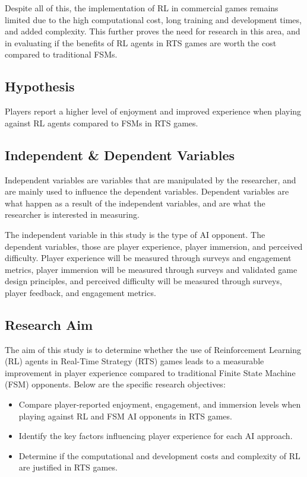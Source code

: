 \documentclass[conference]{IEEEtran}
\begin{document}
Despite all of this, the implementation of RL in commercial games remains limited due to the high computational cost, long training and development times, and added complexity.
This further proves the need for research in this area, and in evaluating if the benefits of RL agents in RTS games are worth the cost compared to traditional FSMs.

\subsection{Hypothesis}

Players report a higher level of enjoyment and improved experience when playing against RL agents compared to FSMs in RTS games.

\subsection{Independent \& Dependent Variables}

Independent variables are variables that are manipulated by the researcher, and are mainly used to influence the dependent variables. Dependent variables are what happen as a result of the independent variables,
and are what the researcher is interested in measuring.

The independent variable in this study is the type of AI opponent. The dependent variables, those are player experience, player immersion, and perceived difficulty.
Player experience will be measured through surveys and engagement metrics, player immersion will be measured through surveys and validated game design principles, and perceived difficulty will be measured through
surveys, player feedback, and engagement metrics.

\subsection{Research Aim}

The aim of this study is to determine whether the use of Reinforcement Learning (RL) agents in Real-Time Strategy (RTS) games leads to a measurable improvement in player experience compared to traditional
Finite State Machine (FSM) opponents. Below are the specific research objectives:

\begin{itemize}
	\item Compare player-reported enjoyment, engagement, and immersion levels when playing against RL and FSM AI opponents in RTS games.
	\item Identify the key factors influencing player experience for each AI approach.
	\item Determine if the computational and development costs and complexity of RL are justified in RTS games.
\end{itemize}
\end{document}
